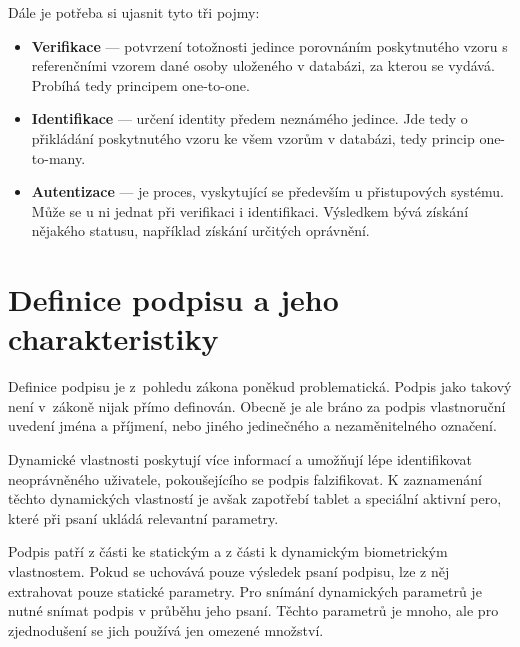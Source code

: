 Dále je potřeba si ujasnit tyto tři pojmy:
\begin{itemize}
  \item \textbf{Verifikace} --- potvrzení totožnosti jedince porovnáním poskytnutého vzoru s referenčními vzorem dané osoby uloženého v databázi, %
  za kterou se vydává. Probíhá tedy principem one-to-one.                                                                                     %
  \item \textbf{Identifikace} --- určení identity předem neznámého jedince.                                                                       %
  Jde tedy o přikládání poskytnutého vzoru ke všem vzorům v databázi, tedy princip one-to-many.                                                %
  \item \textbf{Autentizace} --- je proces, vyskytující se především u přistupových systému.                                                      %
  Může se u ni jednat při verifikaci i identifikaci.                                                                                            %
  Výsledkem bývá získání nějakého statusu, například získání určitých oprávnění.                                                       %
\end{itemize}


\section{Definice podpisu a jeho charakteristiky}
Definice podpisu je z~pohledu zákona poněkud problematická. 
Podpis jako takový není v~zákoně nijak přímo definován. 
Obecně je ale bráno za podpis vlastnoruční uvedení jména a příjmení, nebo jiného jedinečného a nezaměnitelného označení. %

Dynamické vlastnosti poskytují více informací a umožňují lépe identifikovat neoprávněného uživatele, pokoušejícího se podpis falzifikovat.    %
K zaznamenání těchto dynamických vlastností je avšak zapotřebí tablet a speciální aktivní pero, které při psaní ukládá relevantní parametry.  %

Podpis patří z části ke statickým a z části k dynamickým biometrickým vlastnostem.
Pokud se uchovává pouze výsledek psaní podpisu, lze z něj extrahovat pouze statické parametry.
Pro snímání dynamických parametrů je nutné snímat podpis v průběhu jeho psaní.
Těchto parametrů je mnoho, ale pro zjednodušení se jich používá jen omezené množství.

